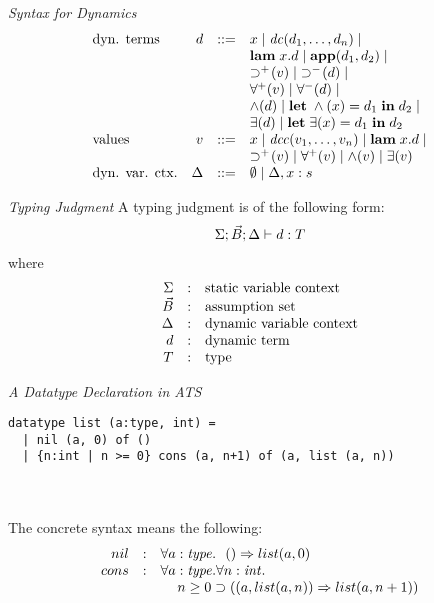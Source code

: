 \documentclass[pdf]{prosper}
\begin{document}
\def\dc{{\it dc}}
\def\dcc{{\it dcc}}
\def\dcf{{\it dcf}}
\def\iforall#1{\forall^{+}(#1)}
\def\eforall#1{\forall^{-}(#1)}
\def\iguard#1{\supset^{+}\kern-2pt(#1)}
\def\eguard#1{\supset^{-}\kern-2pt(#1)}
\def\lam#1#2{\mbox{\bf lam}\;#1.#2}
\def\app#1#2{\mbox{\bf app}(#1,#2)}
\def\letin#1#2{\mbox{\bf let}\;#1\;{\bf in}\;#2}
\begin{slide}{\em Syntax for Dynamics}
\[\begin{array}{lrcl}
\mbox{dyn. terms} & d & ::= & x \mid \dc(d_1,\ldots,d_n) \mid \\
& & & \lam{x}{d} \mid \app{d_1}{d_2} \mid \\
& & & \iguard{v} \mid \;\eguard{d} \mid \\
& & & \iforall{v} \mid \eforall{d} \mid \\
& & & \Band(d) \mid \letin{\Band(x)=d_1}{d_2} \mid \\
& & & \exists(d) \mid \letin{\exists(x)=d_1}{d_2} \\
\mbox{values} & v & ::= & x \mid \dcc(v_1,\ldots,v_n) \mid \lam{x}{d} \mid \\
& & & \iguard{v} \mid \iforall{v} \mid \Band(v) \mid \exists(v) \\
\mbox{dyn. var. ctx.} & \Delta & ::= & \emptyset \mid \Delta, x:s \\
\end{array}\]
\end{slide}
\begin{slide}{\em Typing Judgment}
A typing judgment is of the following form:
\[\begin{array}{c}
\Sigma;\vec{B};\Delta\vdash d:T
\end{array}\]
where
\[\begin{array}{rcl}
\Sigma & : & \mbox{static variable context} \\
\vec{B} & : & \mbox{assumption set} \\
\Delta & : & \mbox{dynamic variable context} \\
d & : & \mbox{dynamic term} \\
T & : & \mbox{type} \\
\end{array}\]
\end{slide}
\begin{slide}{\em A Datatype Declaration in ATS}
{\blue\begin{verbatim}
datatype list (a:type, int) =
  | nil (a, 0) of ()
  | {n:int | n >= 0} cons (a, n+1) of (a, list (a, n))
\end{verbatim}
}~\\~\\
The concrete syntax means the following:
\[\begin{array}{rcl}
nil & : & \forall a:{\it type}.~~() \Rightarrow list (a, 0) \\
cons & : & \forall a:{\it type}.\forall n:{\it int}. \\
     &   & \kern12pt n\geq 0 \supset ((a, list (a, n)) \Rightarrow list (a, n+1)) \\
\end{array}\]
\vfill
\end{slide}
\end{document}
